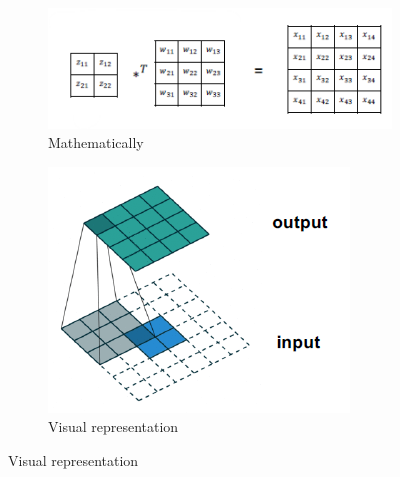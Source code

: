 \begin{figure}[!ht]
    \centering
    \begin{subfigure}[b]{0.45\textwidth}
        \centering
        \includegraphics[width=\linewidth]{img/GAN/transposeConv.png}
        \caption{Mathematically}
        \label{fig:traConv}
    \end{subfigure}
    \hfill
    \begin{subfigure}[b]{0.45\textwidth}
        \centering
        \includegraphics[width=\linewidth]{img/GAN/results.png}
        \caption{Visual representation}
        \label{fig:TConvRes}
    \end{subfigure}
\end{figure}

